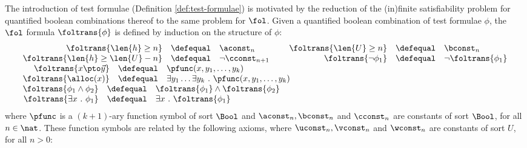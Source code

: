 The introduction of test formulae (Definition \ref{def:test-formulae})
is motivated by the reduction of the (in)finite satisfiability problem
for quantified boolean combinations thereof to the same problem for
$\fol$. Given a quantified boolean combination of test formulae
$\phi$, the $\fol$ formula $\foltrans{\phi}$ is defined by induction
on the structure of $\phi$:
\[\begin{array}{l}
\begin{array}{rclcrcl}
\foltrans{\len{h} \geq n} & \defequal & \aconst_n &~& \foltrans{\len{U} \geq n} & \defequal & \bconst_n \\
\foltrans{\len{h} \geq \len{U} - n} & \defequal & \neg \cconst_{n+1} && \foltrans{\neg\phi_1} & \defequal & \neg\foltrans{\phi_1} \\
\end{array}
\\
\begin{array}{rcl}
\foltrans{x \pto \vec{y}} & \defequal & \pfunc(x,y_1,\ldots,y_k) \\
\foltrans{\alloc(x)} & \defequal & \exists y_1 \ldots \exists y_k ~.~ \pfunc(x,y_1,\ldots,y_k) 
\end{array} 
\\
\begin{array}{rcl}
\foltrans{\phi_1 \wedge \phi_2} & \defequal & \foltrans{\phi_1} \wedge \foltrans{\phi_2} \\
\foltrans{\exists x ~.~ \phi_1} & \defequal & \exists x ~.~ \foltrans{\phi_1}
\end{array}
\end{array}\]
where $\pfunc$ is a $(k+1)$-ary function symbol of sort $\Bool$ and
$\aconst_n,\bconst_n$ and $\cconst_n$ are constants of sort $\Bool$,
for all $n \in \nat$. These function symbols are related by the
following axioms, where $\uconst_n, \vconst_n$ and $\wconst_n$ are
constants of sort $U$, for all $n > 0$:
